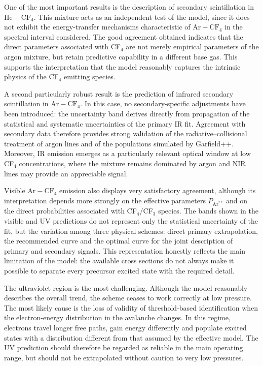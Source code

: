 \documentclass[12pt,a4paper]{article}
\newcommand{\He}{\mathrm{He}}
\newcommand{\Ar}{\mathrm{Ar}}
\newcommand{\CF}{\mathrm{CF}}
\begin{document}
One of the most important results is the description of secondary scintillation in $\He-\CF_4$. This mixture acts as an independent test of the model, since it does not exhibit the energy-transfer mechanisms characteristic of $\Ar-\CF_4$ in the spectral interval considered. The good agreement obtained indicates that the direct parameters associated with CF$_4$ are not merely empirical parameters of the argon mixture, but retain predictive capability in a different base gas. This supports the interpretation that the model reasonably captures the intrinsic physics of the CF$_4$ emitting species.

A second particularly robust result is the prediction of infrared secondary scintillation in $\Ar-\CF_4$. In this case, no secondary-specific adjustments have been introduced: the uncertainty band derives directly from propagation of the statistical and systematic uncertainties of the primary IR fit. Agreement with secondary data therefore provides strong validation of the radiative--collisional treatment of argon lines and of the populations simulated by Garfield++. Moreover, IR emission emerges as a particularly relevant optical window at low CF$_4$ concentrations, where the mixture remains dominated by argon and NIR lines may provide an appreciable signal.

Visible $\Ar-\CF_4$ emission also displays very satisfactory agreement, although its interpretation depends more strongly on the effective parameters $P_{\Ar^{**}}$ and on the direct probabilities associated with CF$_4$/CF$_3$ species. The bands shown in the visible and UV predictions do not represent only the statistical uncertainty of the fit, but the variation among three physical schemes: direct primary extrapolation, the recommended curve and the optimal curve for the joint description of primary and secondary signals. This representation honestly reflects the main limitation of the model: the available cross sections do not always make it possible to separate every precursor excited state with the required detail.

The ultraviolet region is the most challenging. Although the model reasonably describes the overall trend, the scheme ceases to work correctly at low pressure. The most likely cause is the loss of validity of threshold-based identification when the electron-energy distribution in the avalanche changes. In this regime, electrons travel longer free paths, gain energy differently and populate excited states with a distribution different from that assumed by the effective model. The UV prediction should therefore be regarded as reliable in the main operating range, but should not be extrapolated without caution to very low pressures.
\end{document}
